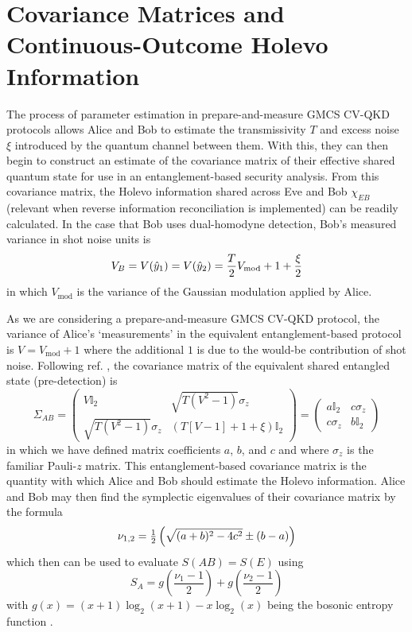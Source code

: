 ﻿\documentclass[12pt]{article}
\begin{document}
\section{Covariance Matrices and Continuous-Outcome Holevo Information}
\label{app: covariance matrices and holevo information}

The process of parameter estimation in prepare-and-measure GMCS CV-QKD protocols allows Alice and Bob to estimate the transmissivity $T$ and excess noise $\xi$ introduced by the quantum channel between them. With this, they can then begin to construct an estimate of the covariance matrix of their effective shared quantum state for use in an entanglement-based security analysis. From this covariance matrix, the Holevo information shared across Eve and Bob $\chi_{EB}$ (relevant when reverse information reconciliation is implemented) can be readily calculated. In the case that Bob uses dual-homodyne detection, Bob's measured variance in shot noise units is
\begin{equation}
  \label{eq: V_B}
  V_B = V(\hat{y}_1) = V(\hat{y}_2) = \frac{T}{2}V_\text{mod} + 1 + \frac{\xi}{2} \\
\end{equation}
in which $V_\text{mod}$ is the variance of the Gaussian modulation applied by Alice. 

As we are considering a prepare-and-measure GMCS CV-QKD protocol, the variance of Alice's `measurements' in the equivalent entanglement-based protocol is $V = V_\text{mod} + 1$ where the additional $1$ is due to the would-be contribution of shot noise. Following ref. \cite{Laudenbach-2018}, the covariance matrix of the equivalent shared entangled state (pre-detection) is
\begin{equation}
\label{eq: sigma_AB}
\Sigma_{A B}=\left(\begin{array}{cc}
V \mathbb{I}_2 & \sqrt{T\left(V^2-1\right)} \sigma_z \\
\sqrt{T\left(V^2-1\right)} \sigma_z & (T[V-1]+1+\xi) \mathbb{I}_2
\end{array}\right) = \left(\begin{array}{cc}
a \mathbb{I}_2 & c \sigma_z \\
c \sigma_z & b \mathbb{I}_2
\end{array}\right)
\end{equation}
in which we have defined matrix coefficients $a$, $b$, and $c$ and where $\sigma_z$ is the familiar Pauli-$z$ matrix. This entanglement-based covariance matrix is the quantity with which Alice and Bob should estimate the Holevo information. Alice and Bob may then find the symplectic eigenvalues of their covariance matrix by the formula
\begin{equation}
\label{symplectic eigenvalues}
\nu_{1,2} = \tfrac{1}{2}\left(\sqrt{(a + b)^2 - 4c^2} \space \pm \space (b - a)\right)
\end{equation}
which then can be used to evaluate $S(AB) = S(E)$ using
\begin{equation}
\label{eq: S_A}
S_A = g\left(\frac{\nu_1 - 1}{2}\right) + g\left(\frac{\nu_2 - 1}{2}\right)
\end{equation}
with $g(x) = (x + 1)\log_2(x + 1) - x\log_2(x)$ being the bosonic entropy function \cite{Laudenbach-2018}.
\end{document}
